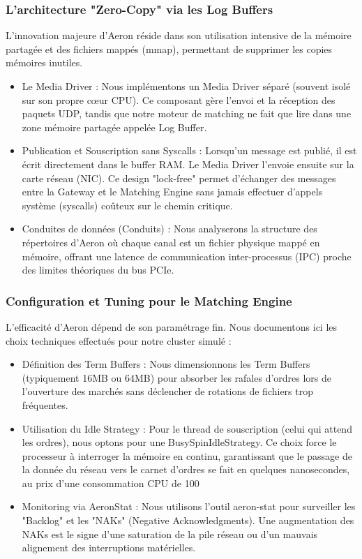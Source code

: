 \subsubsection{L'architecture "Zero-Copy" via les Log Buffers}

L'innovation majeure d'Aeron réside dans son utilisation intensive de la mémoire partagée et des fichiers mappés (mmap), permettant de supprimer les copies mémoires inutiles.

\begin{itemize}
    \item Le Media Driver : Nous implémentons un Media Driver séparé (souvent isolé sur son propre cœur CPU). Ce composant gère l'envoi et la réception des paquets UDP, tandis que notre moteur de matching ne fait que lire dans une zone mémoire partagée appelée Log Buffer.
    \item Publication et Souscription sans Syscalls : Lorsqu'un message est publié, il est écrit directement dans le buffer RAM. Le Media Driver l'envoie ensuite sur la carte réseau (NIC). Ce design "lock-free" permet d'échanger des messages entre la Gateway et le Matching Engine sans jamais effectuer d'appels système (syscalls) coûteux sur le chemin critique.
    \item Conduites de données (Conduits) : Nous analyserons la structure des répertoires d'Aeron où chaque canal est un fichier physique mappé en mémoire, offrant une latence de communication inter-processus (IPC) proche des limites théoriques du bus PCIe.
\end{itemize}

\subsubsection{Configuration et Tuning pour le Matching Engine}

L'efficacité d'Aeron dépend de son paramétrage fin. Nous documentons ici les choix techniques effectués pour notre cluster simulé :

\begin{itemize}
    \item Définition des Term Buffers : Nous dimensionnons les Term Buffers (typiquement 16MB ou 64MB) pour absorber les rafales d'ordres lors de l'ouverture des marchés sans déclencher de rotations de fichiers trop fréquentes.
    \item Utilisation du Idle Strategy : Pour le thread de souscription (celui qui attend les ordres), nous optons pour une BusySpinIdleStrategy. Ce choix force le processeur à interroger la mémoire en continu, garantissant que le passage de la donnée du réseau vers le carnet d'ordres se fait en quelques nanosecondes, au prix d'une consommation CPU de 100%
    \item Monitoring via AeronStat : Nous utilisons l'outil aeron-stat pour surveiller les "Backlog" et les "NAKs" (Negative Acknowledgments). Une augmentation des NAKs est le signe d'une saturation de la pile réseau ou d'un mauvais alignement des interruptions matérielles.
\end{itemize}

